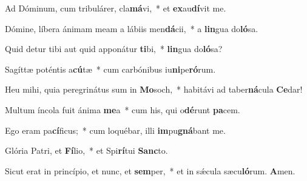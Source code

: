 \item Ad Dóminum, cum tribulárer, cla\textbf{má}vi,~* et \textbf{ex}au\textbf{dí}vit me.

\item Dómine, líbera ánimam meam a lábiis men\textbf{dá}cii,~* a \textbf{lin}gua do\textbf{ló}sa.

\item Quid detur tibi aut quid apponátur \textbf{ti}bi,~* \textbf{lin}gua do\textbf{ló}sa?

\item Sagíttæ poténtis a\textbf{cú}tæ~* cum carbónibus iu\textbf{ni}pe\textbf{ró}rum.

\item Heu mihi, quia peregrinátus sum in \textbf{Mo}soch,~* habitávi ad taber\textbf{ná}cula \textbf{Ce}dar!

\item Multum íncola fuit ánima \textbf{me}a~* cum his, qui o\textbf{dé}runt \textbf{pa}cem.

\item Ego eram pa\textbf{cí}ficus;~* cum loquébar, illi \textbf{im}pu\textbf{gná}bant me.

\item Glória Patri, et \textbf{Fí}lio,~* et Spi\textbf{rí}tui \textbf{Sanc}to.

\item Sicut erat in princípio, et nunc, et \textbf{sem}per,~* et in sǽcula sæcu\textbf{ló}rum. \textbf{A}men.